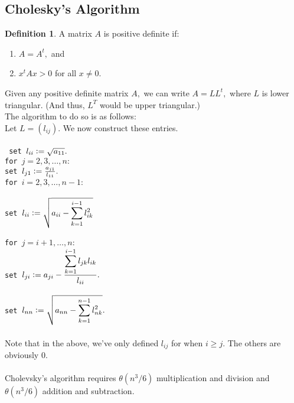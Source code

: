 \documentclass[12pt]{article}
\theoremstyle{definition}
\newtheorem{defn}[thm]{Definition}
\begin{document}
\subsection{Cholesky's Algorithm}
\begin{defn} 
	A matrix $A$ is positive definite if:
	\begin{enumerate} 
		\item $A = A^t,$ and
		\item $x^tAx > 0$ for all $x \neq 0.$
	\end{enumerate}
\end{defn}
Given any positive definite matrix $A,$ we can write $A = LL^t,$ where $L$ is lower triangular. (And thus, $L^T$ would be upper triangular.)\\
The algorithm to do so is as follows:\\
Let $L = (l_{ij}).$ We now construct these entries.\\~\\
\texttt{
	set $l_{ii} \vcentcolon= \sqrt{a_{11}}.$\\
	for $j = 2, 3, \ldots, n:$ \\
	\phantom{123456} set $l_{j1} \vcentcolon= \frac{a_{j1}}{l_{11}}.$\\
	for $i = 2, 3, \ldots, n - 1:$\\~\\
	\phantom{123456} set $l_{ii} \vcentcolon= \sqrt{\displaystyle a_{ii} - \sum_{k=1}^{i-1}l_{ik}^2}$\\~\\
	\phantom{123456} for $j = i+1, \ldots, n:$ \\
	\phantom{123456}\phantom{123456}set $l_{ji} \vcentcolon= \displaystyle a_{ji} - \frac{\displaystyle\sum_{k=1}^{i-1}l_{jk}l_{ik}}{l_{ii}}.$\\~\\
	set $l_{nn} \vcentcolon= \sqrt{a_{nn} - \displaystyle\sum_{k=1}^{n-1}l_{nk}^2}.$
}\\~\\
Note that in the above, we've only defined $l_{ij}$ for when $i \ge j.$ The others are obviously $0.$\\~\\
Cholevsky's algorithm requires $\theta(n^3/6)$ multiplication and division and $\theta(n^3/6)$ addition and subtraction.
\end{document}
